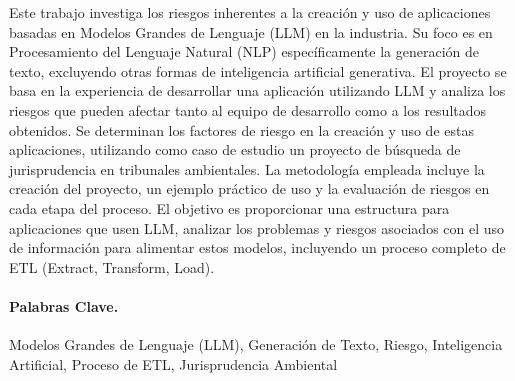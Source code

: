 
\vspace{10mm}

Este trabajo investiga los riesgos inherentes a la creación y uso de aplicaciones basadas en Modelos Grandes de Lenguaje (LLM) en la industria. Su foco es en Procesamiento del Lenguaje Natural (NLP) específicamente la generación de texto, excluyendo otras formas de inteligencia artificial generativa. El proyecto se basa en la experiencia de desarrollar una aplicación utilizando LLM y analiza los riesgos que pueden afectar tanto al equipo de desarrollo como a los resultados obtenidos. Se determinan los factores de riesgo en la creación y uso de estas aplicaciones, utilizando como caso de estudio un proyecto de búsqueda de jurisprudencia en tribunales ambientales. La metodología empleada incluye la creación del proyecto, un ejemplo práctico de uso y la evaluación de riesgos en cada etapa del proceso. El objetivo es proporcionar una estructura para aplicaciones que usen LLM, analizar los problemas y riesgos asociados con el uso de información para alimentar estos modelos, incluyendo un proceso completo de ETL (Extract, Transform, Load).

\paragraph{Palabras Clave.}
Modelos Grandes de Lenguaje (LLM),
Generación de Texto,
Riesgo,
Inteligencia Artificial,
Proceso de ETL,
Jurisprudencia Ambiental

\vspace*{1cm}
%


